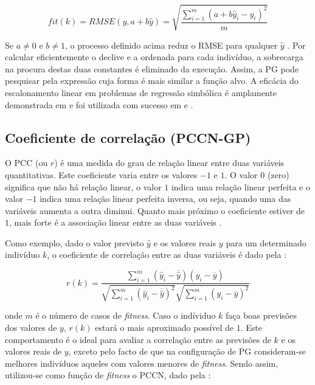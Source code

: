 \begin{equation}
fit(k) = RMSE (y,a+b\hat{y}) = \sqrt{\frac{\sum_{i=1}^{m} (a+b\hat{y}_i - y_i)^2}{m}}
\label{Equacao534}
\end{equation}


Se $a \neq 0$ e $b \neq 1$, o processo definido acima reduz o \ac{RMSE} para qualquer $\hat{y}$ \citep{keijzer03}. Por calcular eficientemente 
o declive e a ordenada para cada indivíduo, a sobrecarga na procura destas duas constantes é eliminado da execução. Assim, a \ac{PG} pode pesquisar 
pela expressão cuja forma é mais similar a função alvo. A eficácia do escalonamento linear em problemas de regressão
simbólica é amplamente demonstrada em \citep{keijzer03} e foi utilizada com sucesso em \citep{Archetti:2006} e \citep{Archetti2007}.


\subsection{Coeficiente de correlação (PCCN-GP)}
\label{PCCNGP}


O \ac{PCC} (ou $r$) é uma medida do grau de relação linear entre duas variáveis quantitativas. 
Este coeficiente varia entre os valores $-1$ e $1$. O valor $0$ (zero) significa que não há relação linear, o valor $1$ indica uma relação 
linear perfeita e o valor $-1$ indica uma relação linear perfeita inversa, ou seja, quando uma das variáveis aumenta a outra diminui. 
Quanto mais próximo o coeficiente estiver de $1$, mais forte é a associação linear entre as duas variáveis \citep{Pearson1920}.

Como exemplo, dado o valor previsto $\hat{y}$ e os valores reais $y$ para um determinado indivíduo $k$, o coeficiente de 
correlação entre as duas variáveis é dado pela :


\begin{equation}
r(k) = \frac{\sum_{i=1}^{m}(\hat{y}_i - \overline{\hat{y}})(y_i-\overline{y})}{\sqrt{\sum_{i=1}^{m}(\hat{y}_i - \overline{\hat{y}})^2}\sqrt{\sum_{i=1}^{m}(y_i-\overline{y})^2}}
\label{Equacao535}
\end{equation}

\noindent onde $m$ é o número de casos de \emph{fitness}. Caso o indíviduo $k$ faça boas previsões dos valores de $y$, $r(k)$ estará o mais 
aproximado possível de $1$. Este comportamento é o ideal para avaliar a correlação entre as previsões de $k$ e os valores reais de $y$, 
exceto pelo facto de que na configuração de \ac{PG} consideram-se melhores indivíduos aqueles com valores menores de \emph{fitness}. 
Sendo assim, utilizou-se como função de \emph{fitness} o \ac{PCCN}, dado pela :

